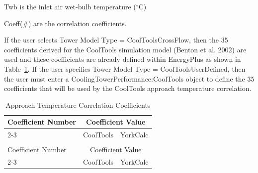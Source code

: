 Twb is the inlet air wet-bulb temperature (\(^{\circ}\)C)

Coeff(\#) are the correlation coefficients.

If the user selects Tower Model Type = CoolToolsCrossFlow, then the 35 coefficients derived for the CoolTools simulation model (Benton et al. 2002) are used and these coefficients are already defined within EnergyPlus as shown in Table~\ref{table:approach-temperature-correlation-coefficients}. If the user specifies Tower Model Type = CoolToolsUserDefined, then the user must enter a CoolingTowerPerformance:CoolTools object to define the 35 coefficients that will be used by the CoolTools approach temperature correlation.

\begin{longtable}[c]{p{2.0in}p{2.0in}p{2.0in}}

\caption{Approach Temperature Correlation Coefficients \label{table:approach-temperature-correlation-coefficients}} \tabularnewline
\toprule
Coefficient Number & \multicolumn{2}{c}{Coefficient Value} \tabularnewline
\cmidrule(r){2-3}
& CoolTools & YorkCalc \tabularnewline
\midrule
\endfirsthead

\caption[]{Approach Temperature Correlation Coefficients} \tabularnewline
\toprule
Coefficient Number & \multicolumn{2}{c}{Coefficient Value} \tabularnewline
\cmidrule(r){2-3}
& CoolTools & YorkCalc \tabularnewline
\midrule
\endhead


\end{longtable}
